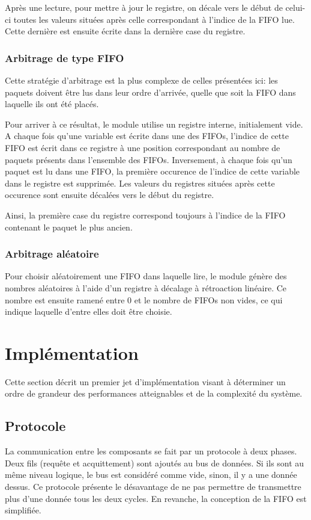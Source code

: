 \documentclass[11pt]{article}
\begin{document}
Après une lecture, pour mettre à jour le registre, on décale vers le début de celui-ci toutes les valeurs
situées après celle correspondant à l'indice de la FIFO lue.
Cette dernière est ensuite écrite dans la dernière case du registre.

\subsubsection{Arbitrage de type FIFO}
Cette stratégie d'arbitrage est la plus complexe de celles présentées ici:
les paquets doivent être lus dans leur ordre d'arrivée, quelle que soit
la FIFO dans laquelle ils ont été placés.

Pour arriver à ce résultat, le module utilise un registre interne, initialement vide.
A chaque fois qu'une variable est écrite dans une des FIFOs, l'indice de cette FIFO est écrit dans ce registre
à une position correspondant au nombre de paquets présents dans l'ensemble des FIFOs.
Inversement, à chaque fois qu'un paquet est lu dans une FIFO, la première occurence de l'indice de cette
variable dans le registre est supprimée. Les valeurs du registres situées après cette occurence sont ensuite décalées vers le début du registre.

Ainsi, la première case du registre correspond toujours à l'indice de la FIFO contenant le paquet le plus ancien.

\subsubsection{Arbitrage aléatoire}
Pour choisir aléatoirement une FIFO dans laquelle lire, le module génère des nombres aléatoires
à l'aide d'un registre à décalage à rétroaction linéaire.
Ce nombre est ensuite ramené entre 0 et le nombre de FIFOs non vides, ce qui indique laquelle d'entre elles doit être choisie.

\section{Implémentation}

Cette section décrit un premier jet d'implémentation visant à déterminer un ordre de grandeur des performances atteignables et de la complexité du système.

\subsection{Protocole}
La communication entre les composants se fait par un protocole à deux phases. Deux fils (requête et acquittement) sont ajoutés au bus de données. Si ils sont au même niveau logique, le bus est considéré comme vide, sinon, il y a une donnée dessus. Ce protocole présente le désavantage de ne pas permettre de transmettre plus d'une donnée tous les deux cycles. En revanche, la conception de la FIFO est simplifiée.
\end{document}
